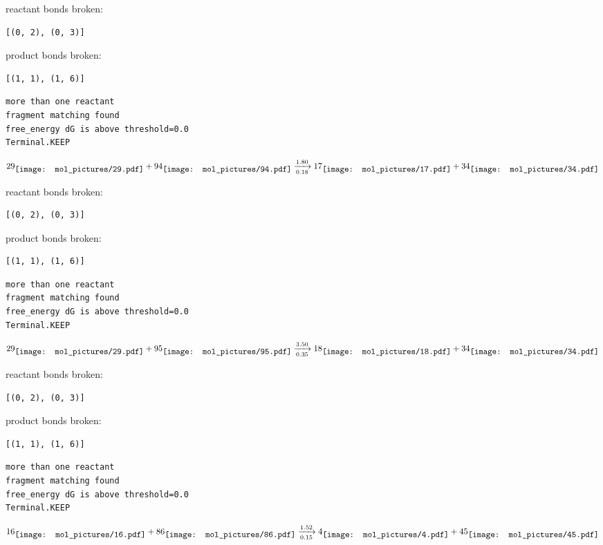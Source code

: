 \documentclass{article}
\begin{document}
reactant bonds broken:\begin{verbatim}
[(0, 2), (0, 3)]
\end{verbatim}
product bonds broken:\begin{verbatim}
[(1, 1), (1, 6)]
\end{verbatim}




\vspace{1cm}
\begin{verbatim}
more than one reactant
fragment matching found
free_energy dG is above threshold=0.0
Terminal.KEEP
\end{verbatim}
$$
29
\raisebox{-.5\height}{\texttt{[image: mol\_pictures/29.pdf]}}
+
94
\raisebox{-.5\height}{\texttt{[image: mol\_pictures/94.pdf]}}
\xrightarrow[0.18]{1.80}
17
\raisebox{-.5\height}{\texttt{[image: mol\_pictures/17.pdf]}}
+
34
\raisebox{-.5\height}{\texttt{[image: mol\_pictures/34.pdf]}}
$$


reactant bonds broken:\begin{verbatim}
[(0, 2), (0, 3)]
\end{verbatim}
product bonds broken:\begin{verbatim}
[(1, 1), (1, 6)]
\end{verbatim}




\vspace{1cm}
\begin{verbatim}
more than one reactant
fragment matching found
free_energy dG is above threshold=0.0
Terminal.KEEP
\end{verbatim}
$$
29
\raisebox{-.5\height}{\texttt{[image: mol\_pictures/29.pdf]}}
+
95
\raisebox{-.5\height}{\texttt{[image: mol\_pictures/95.pdf]}}
\xrightarrow[0.35]{3.50}
18
\raisebox{-.5\height}{\texttt{[image: mol\_pictures/18.pdf]}}
+
34
\raisebox{-.5\height}{\texttt{[image: mol\_pictures/34.pdf]}}
$$


reactant bonds broken:\begin{verbatim}
[(0, 2), (0, 3)]
\end{verbatim}
product bonds broken:\begin{verbatim}
[(1, 1), (1, 6)]
\end{verbatim}




\vspace{1cm}
\begin{verbatim}
more than one reactant
fragment matching found
free_energy dG is above threshold=0.0
Terminal.KEEP
\end{verbatim}
$$
16
\raisebox{-.5\height}{\texttt{[image: mol\_pictures/16.pdf]}}
+
86
\raisebox{-.5\height}{\texttt{[image: mol\_pictures/86.pdf]}}
\xrightarrow[0.15]{1.52}
4
\raisebox{-.5\height}{\texttt{[image: mol\_pictures/4.pdf]}}
+
45
\raisebox{-.5\height}{\texttt{[image: mol\_pictures/45.pdf]}}
$$
\end{document}
